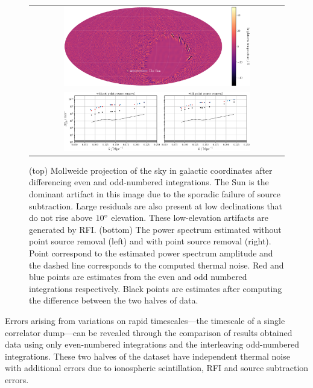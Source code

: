 \begin{bibunit}
\begin{figure}
    \centering
    \begin{tabular}{c}
        \includegraphics[width=0.75\textwidth]{figures/chapter4/even-odd-sky-map-colorbar}\\
        \includegraphics[width=0.75\textwidth]{figures/chapter4/spherical-power-spectrum-even-odd}\\
    \end{tabular}
    \caption{
        (top) Mollweide projection of the sky in galactic coordinates after differencing even and
        odd-numbered integrations. The Sun is the dominant artifact in this image due to the
        sporadic failure of source subtraction. Large residuals are also present at low declinations
        that do not rise above $10\mbox{$^\circ$}$ elevation. These low-elevation artifacts are generated by
        RFI.
        (bottom) The power spectrum estimated without point source removal (left) and with point
        source removal (right). Point correspond to the estimated power spectrum amplitude and the
        dashed line corresponds to the computed thermal noise. Red and blue points are estimates
        from the even and odd numbered integrations respectively. Black points are estimates after
        computing the difference between the two halves of data.
    }
    \label{fig:spherical-power-spectra-even-odd}
\end{figure}

Errors arising from variations on rapid timescales---the timescale of a single correlator dump---can
be revealed through the comparison of results obtained data using only even-numbered integrations
and the interleaving odd-numbered integrations. These two halves of the dataset have independent
thermal noise with additional errors due to ionospheric scintillation, RFI and source subtraction
errors.


\end{bibunit}
